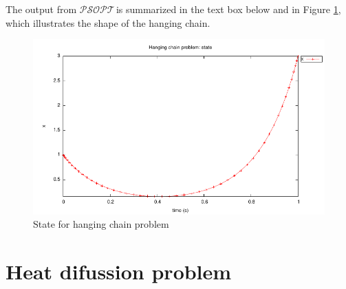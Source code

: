 \documentclass[a4paper,11pt]{report}    %
\newcommand{\psopt}{$\mathcal{PSOPT}$\,}  %
\newenvironment{shadedframe}{%
  \def\FrameCommand{\fcolorbox{black}{shadecolor}}%
  \MakeFramed {\FrameRestore}}
{\endMakeFramed}
\begin{document}
\tiny
\begin{shadedframe}

\end{shadedframe}
\normalsize
The output from \psopt is summarized in the text box below and in Figure
\ref{chain_state}, which illustrates the shape of the hanging chain.

\small
\begin{shadedframe}

\end{shadedframe}
\normalsize

\begin{figure}
  \centering
  \includegraphics{../examples/chain/chain_state}
  \caption{State for hanging chain problem}
  \label{chain_state}
\end{figure}



\section{Heat difussion problem}
\end{document}
